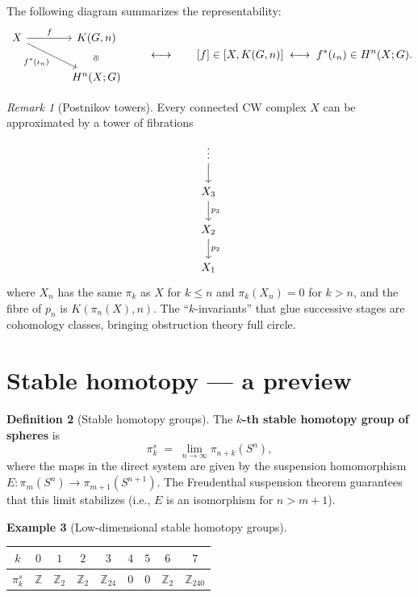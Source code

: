 \documentclass[12pt,a4paper,openany]{book}
\theoremstyle{definition}
\newtheorem{definition}{Definition}[chapter]
\newtheorem{example}[definition]{Example}
\theoremstyle{plain}
\theoremstyle{remark}
\newtheorem{remark}[definition]{Remark}
\newcommand{\Z}{\mathbb{Z}}
\begin{document}
The following diagram summarizes the representability:
\[
\begin{tikzcd}[column sep=large]
  X \ar[r,"f"] \ar[rd,"f^*(\iota_n)"']
  & K(G,n) \\
  & H^n(X;G) \ar[u,phantom,"\scriptstyle\cong"
    description,sloped]
\end{tikzcd}
\qquad\longleftrightarrow\qquad
[f]\in[X,K(G,n)]\;\longleftrightarrow\;
f^*(\iota_n)\in H^n(X;G).
\]

\begin{remark}[Postnikov towers]
Every connected CW complex $X$ can be approximated by a tower of
fibrations
\[
\begin{tikzcd}
  \vdots \ar[d] \\
  X_3 \ar[d,"p_3"] \\
  X_2 \ar[d,"p_2"] \\
  X_1
\end{tikzcd}
\]
where $X_n$ has the same $\pi_k$ as $X$ for $k\le n$ and
$\pi_k(X_n)=0$ for $k>n$, and the fibre of $p_n$ is $K(\pi_n(X),n)$.
The ``$k$-invariants'' that glue successive stages are cohomology
classes, bringing obstruction theory full circle.
\end{remark}

\section{Stable homotopy --- a preview}\label{sec:stable-homotopy}

\begin{definition}[Stable homotopy groups]
The \textbf{$k$-th stable homotopy group of spheres} is
\[
  \pi_k^s
  \;=\;
  \lim_{n\to\infty}\pi_{n+k}(S^n),
\]
where the maps in the direct system are given by the suspension
homomorphism $E\colon\pi_m(S^n)\to\pi_{m+1}(S^{n+1})$.
The Freudenthal suspension theorem
guarantees that this limit stabilizes (i.e., $E$ is an isomorphism for
$n>m+1$).
\end{definition}

\begin{example}[Low-dimensional stable homotopy groups]
\begin{center}
\renewcommand{\arraystretch}{1.2}
\begin{tabular}{c|cccccccc}
  $k$ & $0$ & $1$ & $2$ & $3$ & $4$ & $5$ & $6$ & $7$ \\
  \hline
  $\pi_k^s$ & $\Z$ & $\Z_2$ & $\Z_2$ & $\Z_{24}$ & $0$ & $0$
  & $\Z_2$ & $\Z_{240}$
\end{tabular}
\end{center}
\end{example}
\end{document}
